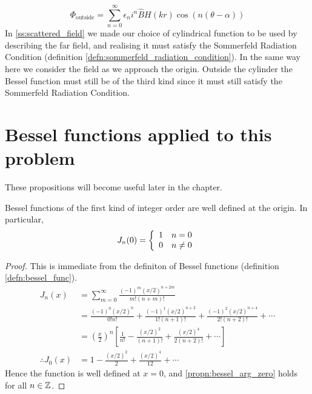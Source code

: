   \begin{equation}
    \Phi_{\text{outside}} = \sum^\infty_{n=0} \epsilon_n i^n \hat{B} H(kr) \cos(n(\theta-\alpha))
  \end{equation}
%
In \ref{ss:scattered_field} we made our choice of cylindrical function to be used by describing the far field, and realising it must satisfy the Sommerfeld Radiation Condition (definition \ref{defn:sommerfeld_radiation_condition}). In the same way here we consider the field as we approach the origin. Outside the cylinder the Bessel function must still be of the third kind since it must still satisfy the Sommerfeld Radiation Condition.
%
%
%
\section{Bessel functions applied to this problem}
These propositions will become useful later in the chapter.
%
  \begin{propn}\label{propn:bessel_at_origin}
    Bessel functions of the first kind of integer order are well defined at the origin. In particular,
    \begin{align}\label{propn:bessel_arg_zero}
        J_n(0) =\left\{
          \begin{array}{c l}
               1 & n = 0 \\
               0 & n \neq 0
          \end{array}\right.
    \end{align}
  \end{propn}
  \begin{proof}
    This is immediate from the definiton of Bessel functions (definition \ref{defn:bessel_func}).
      \begin{align*}
        J_n(x)
          &= \sum^\infty_{m=0} \frac{(-1)^m(x/2)^{n+2m}}{m! (n+m)!}\\
          &= \frac{(-1)^0(x/2)^{n}}{0!n!}         %
            + \frac{(-1)^1(x/2)^{n+2}}{1!(n+1)!}  %
            + \frac{(-1)^2(x/2)^{n+4}}{2!(n+2)!}  %
            + \dotsb \\
          &= \left(\frac{x}{2}\right)^n
            \left[\frac{1}{n!}           %
            - \frac{(x/2)^{2}}{(n+1)!}   %
            + \frac{(x/2)^{4}}{2(n+2)!}  %
            + \dotsb \right]\\
        \therefore
        J_0(x)
          &= 1
            - \frac{(x/2)^{2}}{2}
            + \frac{(x/2)^{4}}{12} + \dotsb
      \end{align*}
    Hence the function is well defined at $x=0$, and \ref{propn:bessel_arg_zero} holds for all $n \in \mathbb{Z}$.
  \end{proof}\par
